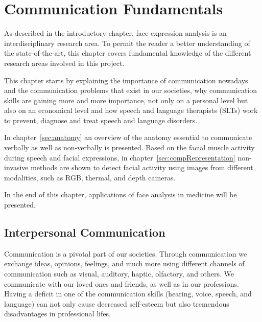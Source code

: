 \chapter{Communication Fundamentals}
\label{cha:fundamentals}

As described in the introductory chapter, face expression analysis is an interdisciplinary research area. To permit the reader a better understanding of the state-of-the-art, this chapter covers fundamental knowledge of the different research areas involved in this project. 

This chapter starts by explaining the importance of communication nowadays and the communication problems that exist in our societies, why communication skills are gaining more and more importance, not only on a personal level but also on an economical level and how speech and language therapists (SLTs) work to prevent, diagnose and treat speech and language disorders.

In chapter~\ref{sec:anatomy} an overview of the anatomy essential to communicate verbally as well as non-verbally is presented. Based on the facial muscle activity during speech and facial expressions, in chapter~\ref{sec:compRepresentation} non-invasive methods are shown to detect facial activity using images from different modalities, such as RGB, thermal, and depth cameras.

In the end of this chapter, applications of face analysis in medicine will be presented. 


\section{Interpersonal Communication} %
\label{sec:communication}

Communication is a pivotal part of our societies. Through communication we exchange ideas, opinions, feelings, and much more using different channels of communication such as visual, auditory, haptic, olfactory, and others. We communicate with our loved ones and friends, as well as in our professions. Having a deficit in one of the communication skills (hearing, voice, speech, and language) can not only cause decreased self-esteem but also tremendous disadvantages in professional lifes. 

